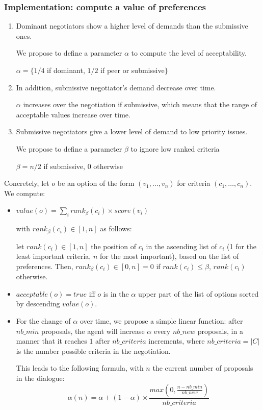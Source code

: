 \documentclass{llncs}
\begin{document}
\subsubsection{Implementation: compute a value of preferences}
\begin{enumerate}
	\item Dominant negotiators show a higher level of demands than the submissive ones.
	
	We propose to define a parameter $\alpha$ to compute the level of acceptability.
	
	$\alpha = \{ 1/4$ if dominant, $1/2$ if peer or submissive$\}$ 
	
	\item In addition, submissive negotiator's demand decrease over time. 
	
	$ \alpha$ increases over the negotiation if submissive, which means that the range of acceptable values increase over time.
	
	\item Submissive negotiators give a lower level of demand to low priority issues.
	
	We propose to define a parameter $\beta$ to ignore low ranked criteria 
	
	$\beta = n/2$ if submissive, $0$ otherwise
\end{enumerate}

Concretely, let $o$ be an option of the form $(v_1,\ldots,v_n)$ for criteria $(c_1,\ldots,c_n)$. We compute:
\begin{itemize}
	\item $value(o) = \sum_i rank_\beta(c_i)\times score(v_i)$
	
	with $rank_\beta(c_i)\in[1,n]$ as follows:
	
	let $rank(c_i)\in[1,n]$ the position of $c_i$ in the ascending list of $c_i$ (1 for the least important criteria, $n$ for the most important), based on the list of preferences. Then, $rank_\beta(c_i)\in[0,n] = 0$ if $rank(c_i)\leq \beta$, $rank(c_i)$ otherwise.
	
	\item $acceptable(o) = true$ iff $o$ is in the $\alpha$ upper part of the list of options sorted by descending $value(o)$.
	\item For the change of $\alpha$ over time, we propose a simple linear function: after $nb\_min$ proposals, the agent will increase $\alpha$ every $nb\_new$ proposals, in a manner that it reaches $1$ after $nb\_criteria$ increments, where $nb\_criteria = |C|$ is the number possible criteria in the negotiation.
	
	This leads to the following formula, with $n$ the current number of proposals in the dialogue:
	$$\alpha(n) = \alpha + (1-\alpha)\times\frac{max(0,\frac{n-nb\_min}{nb\_new})}{nb\_criteria}$$
\end{itemize}
\end{document}
